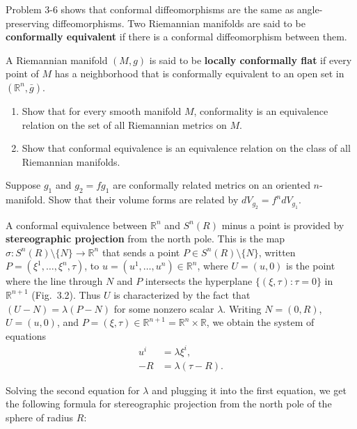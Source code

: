Problem 3-6 shows that conformal diffeomorphisms are the same as angle-preserving diffeomorphisms. Two Riemannian manifolds are said to be \textbf{conformally equivalent} if there is a conformal diffeomorphism between them.

A Riemannian manifold $(M, g)$ is said to be \textbf{locally conformally flat} if every point of $M$ has a neighborhood that is conformally equivalent to an open set in $(\mathbb{R}^n, \bar{g})$.

\begin{exercise}\label{exer:conformality-equivalence-relation}
\begin{enumerate}
\item[(a)] Show that for every smooth manifold $M$, conformality is an equivalence relation on the set of all Riemannian metrics on $M$.
\item[(b)] Show that conformal equivalence is an equivalence relation on the class of all Riemannian manifolds.
\end{enumerate}
\end{exercise}

\begin{exercise}\label{exer:conformal-volume-forms}
Suppose $g_1$ and $g_2 = f g_1$ are conformally related metrics on an oriented $n$-manifold. Show that their volume forms are related by $d V_{g_2} = f^n d V_{g_1}$.
\end{exercise}

A conformal equivalence between $\mathbb{R}^n$ and $S^n(R)$ minus a point is provided by \textbf{stereographic projection} from the north pole. This is the map $\sigma : S^n(R) \setminus \{N\} \to \mathbb{R}^n$ that sends a point $P \in S^n(R) \setminus \{N\}$, written $P = (\xi^1, \ldots, \xi^n, \tau)$, to $u = (u^1, \ldots, u^n) \in \mathbb{R}^n$, where $U = (u, 0)$ is the point where the line through $N$ and $P$ intersects the hyperplane $\{(\xi, \tau) : \tau = 0\}$ in $\mathbb{R}^{n+1}$ (Fig.~3.2). Thus $U$ is characterized by the fact that $(U - N) = \lambda(P - N)$ for some nonzero scalar $\lambda$. Writing $N = (0, R)$, $U = (u, 0)$, and $P = (\xi, \tau) \in \mathbb{R}^{n+1} = \mathbb{R}^n \times \mathbb{R}$, we obtain the system of equations
\begin{align*}
u^i &= \lambda \xi^i, \\
-R &= \lambda(\tau - R).
\tag{3.3}
\end{align*}

Solving the second equation for $\lambda$ and plugging it into the first equation, we get the following formula for stereographic projection from the north pole of the sphere of radius $R$:

